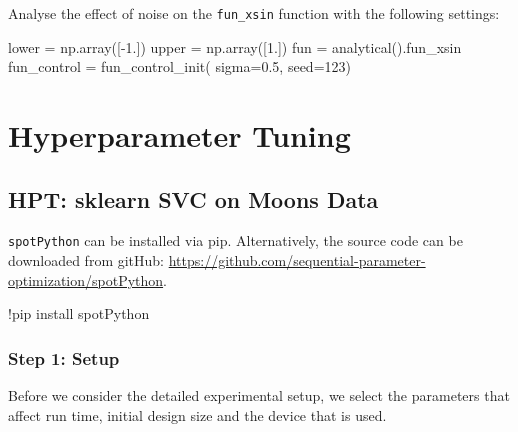 \documentclass[
  letterpaper,
  DIV=11,
  numbers=noendperiod]{scrreprt}
\newenvironment{Shaded}{\begin{snugshade}}{\end{snugshade}}
\newcommand{\DecValTok}[1]{\textcolor[rgb]{0.68,0.00,0.00}{#1}}
\newcommand{\FloatTok}[1]{\textcolor[rgb]{0.68,0.00,0.00}{#1}}
\newcommand{\NormalTok}[1]{\textcolor[rgb]{0.00,0.23,0.31}{#1}}
\newcommand{\OperatorTok}[1]{\textcolor[rgb]{0.37,0.37,0.37}{#1}}
\begin{document}
Analyse the effect of noise on the \texttt{fun\_xsin} function with the
following settings:

\begin{Shaded}
\begin{Highlighting}[]
\NormalTok{lower }\OperatorTok{=}\NormalTok{ np.array([}\OperatorTok{{-}}\FloatTok{1.}\NormalTok{])}
\NormalTok{upper }\OperatorTok{=}\NormalTok{ np.array([}\FloatTok{1.}\NormalTok{])}
\NormalTok{fun }\OperatorTok{=}\NormalTok{ analytical().fun\_xsin}
\NormalTok{fun\_control }\OperatorTok{=}\NormalTok{ fun\_control\_init(    }
\NormalTok{    sigma}\OperatorTok{=}\FloatTok{0.5}\NormalTok{,}
\NormalTok{    seed}\OperatorTok{=}\DecValTok{123}\NormalTok{)}
\end{Highlighting}
\end{Shaded}

\part{Hyperparameter Tuning}

\hypertarget{sec-hpt-sklearn-svc}{%
\chapter{HPT: sklearn SVC on Moons Data}\label{sec-hpt-sklearn-svc}}

\texttt{spotPython} can be installed via pip. Alternatively, the source
code can be downloaded from gitHub:
\url{https://github.com/sequential-parameter-optimization/spotPython}.

\begin{Shaded}
\begin{Highlighting}[]
\NormalTok{!pip install spotPython}
\end{Highlighting}
\end{Shaded}

\hypertarget{sec-setup-10}{%
\section{Step 1: Setup}\label{sec-setup-10}}

Before we consider the detailed experimental setup, we select the
parameters that affect run time, initial design size and the device that
is used.
\end{document}
